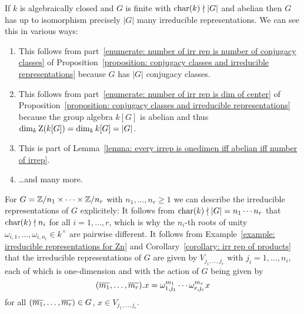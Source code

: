 \begin{example}
  \label{example: irrep of finite abelian groups}
  If $k$ is algebraically closed and $G$ is finite with $\operatorname{char}(k) \nmid |G|$ and abelian then $G$ has up to isomorphism precisely $|G|$ many irreducible representations.
  We can see this in various ways:
  \begin{enumerate}
    \item
      This follows from part~\ref*{enumerate: number of irr rep is number of conjugacy classes} of Proposition~\ref*{proposition: conjugacy classes and irreducible representations} because $G$ has $|G|$ conjugacy classes.
    \item
      This follows from part~\ref*{enumerate: number of irr rep is dim of center} of Proposition~\ref*{proposition: conjugacy classes and irreducible representations} because the group algebra $k[G]$ is abelian and thus $\dim_k \operatorname{Z}(k[G]) = \dim_k k[G] = |G|$.
    \item
      This is part of Lemma~\ref*{lemma: every irrep is onedimen iff abelian iff number of irrep}.
    \item
      \dots and many more.
  \end{enumerate}
  For $G = \mathbb{Z}/n_1 \times \dotsb \times \mathbb{Z}/n_r$ with $n_1, \dotsc, n_r \geq 1$ we can describe the irreducible representations of $G$ explicitely:
  It follows from $\operatorname{char}(k) \nmid |G| = n_1 \dotsm n_r$ that $\operatorname{char}(k) \nmid n_i$ for all $i = 1, \dotsc, r$, which is why the $n_i$-th roots of unity $\omega_{i,1}, \dotsc, \omega_{i,n_i} \in k^\times$ are pairwise different.
  It follows from Example~\ref{example: irreducible representations for Zn} and Corollary~\ref{corollary: irr rep of products} that the irreducible representations of $G$ are given by $V_{j_1, \dotsc, j_r}$ with $j_i = 1, \dotsc, n_i$, each of which is one-dimension and with the action of $G$ being given by
  \[
      (\overline{m_1}, \dotsc, \overline{m_r}) . x
    = \omega_{1,j_1}^{m_1} \dotsm \omega_{r,j_r}^{m_r} x
  \]
  for all $(\overline{m_1}, \dotsc, \overline{m_r}) \in G$, $x \in V_{j_1, \dotsc, j_r}$.
\end{example}




